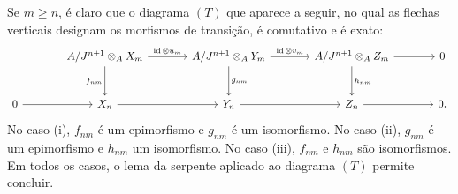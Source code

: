 \begin{prooftext}[Demonstração]
Se $m\ge n$, é claro que o diagrama $(T)$ que aparece a seguir, no qual as flechas verticais designam os morfismos de transição, é comutativo e é exato:
\[
\begin{tikzcd}[column sep=large,row sep=large]
{} & A/J^{n+1}\otimes_A X_m \arrow[r,"\id\otimes u_m"] \arrow[d,"f_{nm}"'] & A/J^{n+1}\otimes_A Y_m \arrow[r,"\id\otimes v_m"] \arrow[d,"g_{nm}"] & A/J^{n+1}\otimes_A Z_m \arrow[r] \arrow[d,"h_{nm}"] & 0\\
0 \arrow[r] & X_n \arrow[r] & Y_n \arrow[r] & Z_n \arrow[r] & 0 .
\end{tikzcd}
\]
No caso (i), $f_{nm}$ é um epimorfismo e $g_{nm}$ é um isomorfismo. No caso (ii), $g_{nm}$ é um epimorfismo e $h_{nm}$ um isomorfismo. No caso (iii), $f_{nm}$ e $h_{nm}$ são isomorfismos. Em todos os casos, o lema da serpente aplicado ao diagrama $(T)$ permite concluir.
\end{prooftext}
